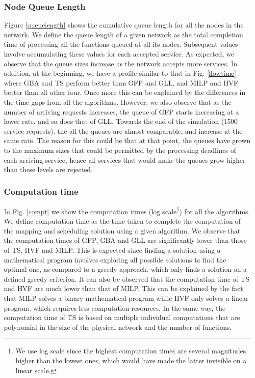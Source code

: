 \documentclass[conference]{IEEEtran}
\begin{document}
\subsubsection{Node Queue Length}
Figure \ref{queuelength} shows the cumulative queue length for all the nodes in the network. We define the queue length of a given network as the total completion time of processing all the functions queued at all its nodes. Subsequent values involve accumulating these values for each accepted service. As expected, we observe that the queue sizes increase as the network accepts more services. In addition, at the beginning, we have a profile similar to that in Fig. \ref{flowtime} where GBA and TS perform better than GFP and GLL, and MILP and HVF better than all other four. Once more this can be explained by the differences in the time gaps from all the algorithms. However, we also observe that as the number of arriving requests increases, the queue of GFP starts increasing at a lower rate, and so does that of GLL. Towards the end of the simulation (1500 service requests), the all the queues are almost comparable, and increase at the same rate. The reason for this could be that at that point, the queues have grown to the maximum sizes that could be permitted by the processing deadlines of each arriving service, hence all services that would make the queues grow higher than these levels are rejected.

\subsubsection{Computation time}In Fig. \ref{compt} we show the computation times (log scale\footnote{We use log scale since the highest computation times are several magnitudes higher than the lowest ones, which would have made the latter invisible on a linear scale.}) for all the algorithms. We define computation time as the time taken to complete the computation of the mapping and scheduling solution using a given algorithm. We observe that the computation times of GFP, GBA and GLL are significantly lower than those of TS, HVF and MILP. This is expected since finding a solution using a mathematical program involves exploring all possible solutions to find the optimal one, as compared to a greedy approach, which only finds a solution on a defined greedy criterion. It can also be observed that the computation time of TS and HVF are much lower than that of MILP. This can be explained by the fact that MILP solves a binary mathematical program while HVF only solves a linear program, which requires less computation resources. In the same way, the computation time of TS is based on multiple individual computations that are polynomial in the size of the physical network and the number of functions. 
\end{document}
